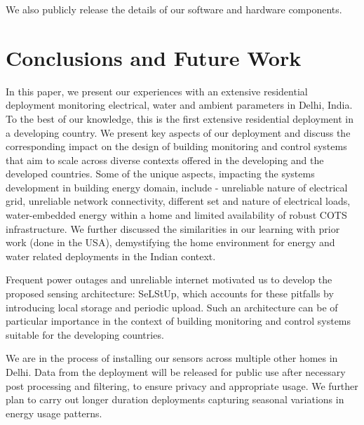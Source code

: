 \documentclass[10pt]{sensys-proc}
\newcommand{\selstup}{SeLStUp}
\begin{document}
We also publicly release the details of our software and hardware components.


\section{Conclusions and Future Work}
In this paper, we present our experiences with an extensive residential deployment monitoring electrical, water and ambient parameters in Delhi, India. To the best of our knowledge, this is the first extensive residential deployment in a developing country. We present key aspects of our deployment and discuss the corresponding impact on the design of building monitoring and control systems that aim to scale across diverse contexts offered in the developing and the developed countries. Some of the unique aspects, impacting the systems development in building energy domain, include - unreliable nature of electrical grid, unreliable network connectivity, different set and nature of electrical loads, water-embedded energy within a home and limited availability of robust COTS infrastructure. We further discussed the similarities in our learning with prior work (done in the USA), demystifying the home environment for energy and water related deployments in the Indian context. %

Frequent power outages and unreliable internet motivated us to develop the proposed sensing architecture: \selstup, which accounts for these pitfalls by introducing local storage and periodic upload. Such an architecture can be of particular importance in the context of building monitoring and control systems suitable for the developing countries. 

We are in the process of installing our sensors across multiple other homes in Delhi. Data from the deployment will be released for public use after necessary post processing and filtering, to ensure privacy and appropriate usage. We further plan to carry out longer duration deployments capturing seasonal variations in energy usage patterns. %

\balance


 
\end{document}
